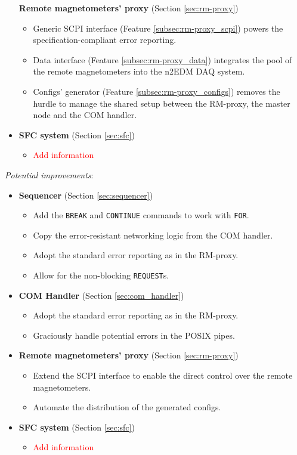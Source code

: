 \begin{itemize}
{		\textbf{Remote magnetometers' proxy} (Section \ref{sec:rm-proxy})
		\begin{itemize}
			\item Generic SCPI interface (Feature \ref{subsec:rm-proxy_scpi}) powers the specification-compliant \cite{SCPIConsortium1999} error reporting.
			\item Data interface (Feature \ref{subsec:rm-proxy_data}) integrates the pool of the remote magnetometers into the n2EDM DAQ system.
			\item Configs' generator (Feature \ref{subsec:rm-proxy_configs}) removes the hurdle to manage the shared setup between the RM-proxy, the master node and the COM handler.
		\end{itemize}
	}
	\item{
		\textbf{SFC system} (Section \ref{sec:sfc})
		\begin{itemize}
			\item \textcolor{red}{Add information}
		\end{itemize}
	}
\end{itemize}

\textit{Potential improvements}:
\begin{itemize}
	\item{
		\textbf{Sequencer} (Section \ref{sec:sequencer})
		\begin{itemize}
			\item Add the \texttt{BREAK} and \texttt{CONTINUE} commands to work with \texttt{FOR}.
			\item Copy the error-resistant networking logic from the COM handler.
			\item Adopt the standard error reporting as in the RM-proxy.
			\item Allow for the non-blocking \texttt{REQUEST}s.
		\end{itemize}
	}
	\item{
		\textbf{COM Handler} (Section \ref{sec:com_handler})
		\begin{itemize}
			\item Adopt the standard error reporting as in the RM-proxy.
			\item Graciously handle potential errors in the POSIX pipes.
		\end{itemize}
	}
	\item{
		\textbf{Remote magnetometers' proxy} (Section \ref{sec:rm-proxy})
		\begin{itemize}
			\item Extend the SCPI interface to enable the direct control over the remote magnetometers.
			\item Automate the distribution of the generated configs.
		\end{itemize}
	}
	\item{
		\textbf{SFC system} (Section \ref{sec:sfc})
		\begin{itemize}
			\item \textcolor{red}{Add information}
		\end{itemize}
	}
\end{itemize}
